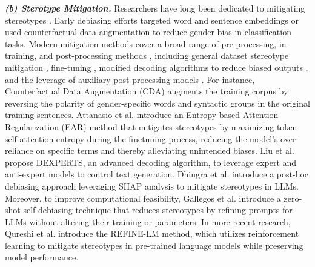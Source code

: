 \textbf{\textit{(b) Sterotype Mitigation.}} Researchers have long been dedicated to mitigating stereotypes \cite{liu2023trustworthy, fairnesssurvey, gallegos2024biassurvey, fairnessSurvey2}. 
Early debiasing efforts targeted word and sentence embeddings \cite{bolukbasi2016man, sun2019mitigating} or used counterfactual data augmentation \cite{mitigatebias3, hovy2021five} to reduce gender bias in classification tasks. Modern mitigation methods cover a broad range of pre-processing, in-training,
and post-processing methods \cite{gallegos2024selfdebias}, including general dataset stereotype mitigation \cite{garimella2022demographic, ghanbarzadeh2023gender, zayed2023deep, qian2022perturbation}, fine-tuning \cite{woo2023compensatory, attanasio2022entropy, yu2023unlearning}, modified decoding algorithms to reduce biased outputs \cite{dathathri2019plug, meade2023using, krause2020gedi, liu2021dexperts}, and the leverage of auxiliary post-processing models \cite{dhingra2023queer, jain2021generating, majumder2022interfair, sun2021they}. For instance, Counterfactual Data Augmentation (CDA) \cite{DisCo, pitis2022mocoda} augments the training corpus by reversing the polarity of gender-specific words and syntactic groups in the original training sentences. Attanasio et al. \cite{attanasio2022entropy} introduce an Entropy-based Attention Regularization (EAR) method that mitigates stereotypes by maximizing token self-attention entropy during the finetuning process, reducing the model's over-reliance on specific terms and thereby alleviating unintended biases. Liu et al. \cite{liu2021dexperts} propose DEXPERTS, an advanced decoding algorithm, to leverage expert and anti-expert models to control text generation. Dhingra et al. \cite{dhingra2023queer} introduce a post-hoc debiasing approach leveraging SHAP analysis to mitigate stereotypes in LLMs. Moreover, to improve computational feasibility, Gallegos et al. \cite{gallegos2024selfdebias} introduce a zero-shot self-debiasing technique that reduces stereotypes by refining prompts for LLMs without altering their training or parameters. In more recent research, Qureshi et al. \cite{qureshi2024refine} introduce the REFINE-LM method, which utilizes reinforcement learning to mitigate stereotypes in pre-trained language models while preserving model performance.

